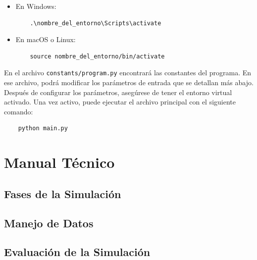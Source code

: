 \documentclass{article}
\begin{document}
\begin{itemize}
  \item En Windows:
        \begin{verbatim}
    .\nombre_del_entorno\Scripts\activate
  \end{verbatim}
  \item En macOS o Linux:
        \begin{verbatim}
    source nombre_del_entorno/bin/activate
  \end{verbatim}
\end{itemize}

En el archivo \texttt{constants/program.py} encontrará las constantes del programa.
En ese archivo, podrá modificar los parámetros de entrada que se detallan más abajo.\\

Después de configurar los parámetros, asegúrese de tener el entorno virtual activado.
Una vez activo, puede ejecutar el archivo principal con el siguiente comando:

\begin{center}
  \begin{adjustbox}{minipage=\linewidth, center}
    \begin{verbatim}
    python main.py
  \end{verbatim}
  \end{adjustbox}
\end{center}


\section{Manual Técnico}\label{sec:man_t}


\subsection{Fases de la Simulación}


\subsection{Manejo de Datos}

\subsection{Evaluación de la Simulación}
\end{document}

